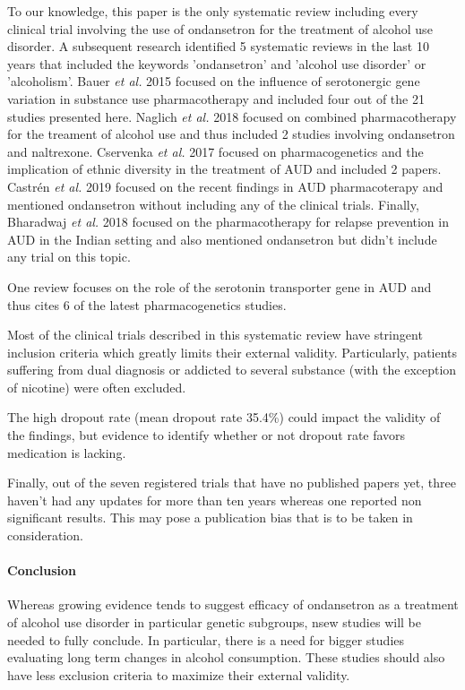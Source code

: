 To our knowledge, this paper is the only systematic review including every clinical trial involving the use of ondansetron for the treatment of alcohol use disorder. A subsequent research identified 5 systematic reviews in the last 10 years that included the keywords 'ondansetron' and 'alcohol use disorder' or 'alcoholism'. Bauer \textit{et al.} 2015 \cite{bauer_serotonergic_2015} focused on the influence of serotonergic gene variation in substance use pharmacotherapy and included four out of the 21 studies presented here. Naglich \textit{et al.} 2018 \cite{naglich_systematic_2018} focused on combined pharmacotherapy for the treament of alcohol use and thus included 2 studies involving ondansetron and naltrexone. Cservenka \textit{et al.} 2017 \cite{cservenka_review_2017} focused on pharmacogenetics and the implication of ethnic diversity in the treatment of AUD and included 2 papers. Castrén \textit{et al.} 2019 \cite{castren_selecting_2019} focused on the recent findings in AUD pharmacoterapy and mentioned ondansetron without including any of the clinical trials. Finally, Bharadwaj \textit{et al.} 2018 \cite{bharadwaj_pharmacotherapy_2018} focused on the pharmacotherapy for relapse prevention in AUD in the Indian setting and also mentioned ondansetron but didn't include any trial on this topic.

One review \cite{thompson_variation_2016} focuses on the role of the serotonin transporter gene in AUD and thus cites 6 of the latest pharmacogenetics studies.

Most of the clinical trials described in this systematic review have stringent inclusion criteria which greatly limits their external validity. Particularly, patients suffering from dual diagnosis or addicted to several substance (with the exception of nicotine) were often excluded. 

The high dropout rate (mean dropout rate 35.4\%) could impact the validity of the findings, but evidence to identify whether or not dropout rate favors medication is lacking.

Finally, out of the seven registered trials that have no published papers yet, three haven't had any updates for more than ten years whereas one reported non significant results. This may pose a publication bias that is to be taken in consideration.

\paragraph{Conclusion} Whereas growing evidence tends to suggest efficacy of ondansetron as a treatment of alcohol use disorder in particular genetic subgroups, nsew studies will be needed to fully conclude. In particular, there is a need for bigger studies evaluating long term changes in alcohol consumption. These studies should also have less exclusion criteria to maximize their external validity.

